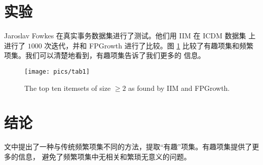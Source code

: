 \documentclass{ctexart}
\begin{document}
\section{实验}
Jaroslav Fowkes 在真实事务数据集进行了测试。他们用 IIM 在 ICDM 数据集 \cite{DeBie} 上进行了 $1000$ 次迭代，并和
FPGrowth 进行了比较。图 \ref{fig:tab1} 比较了有趣项集和频繁项集。我们可以清楚地看到，有趣项集告诉了我们更多的
信息。

\begin{figure}
\centering
\texttt{[image: pics/tab1]}
\caption{The top ten itemsets of size $\ge 2$ as found by IIM and FPGrowth.}
\label{fig:tab1}
\end{figure}

\section{结论}
文中提出了一种与传统频繁项集不同的方法，提取“有趣”项集。有趣项集提供了更多的信息，
避免了频繁项集中无相关和繁琐无意义的问题。

\pagebreak

\end{document}
